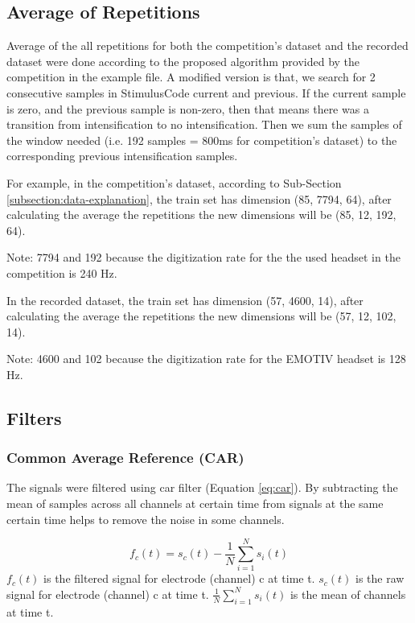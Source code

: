 \subsection{Average of Repetitions}
Average of the all repetitions for both the competition's dataset and the recorded dataset were done according to the proposed algorithm provided by the competition in the example file. A modified version is that, we search for 2 consecutive samples in StimulusCode current and previous. If the current sample is zero, and the previous sample is non-zero, then that means there was a transition from intensification to no intensification. Then we sum the samples of the window needed (i.e. 192 samples = 800ms for competition's dataset) to the corresponding previous intensification samples.\par
For example, in the competition's dataset, according to Sub-Section \ref{subsection:data-explanation}, the train set has dimension (85, 7794, 64), after calculating the average the repetitions the new dimensions will be (85, 12, 192, 64).\par
Note: 7794 and 192 because the digitization rate for the the used headset in the competition is 240 Hz.\par
In the recorded dataset, the train set has dimension (57, 4600, 14), after calculating the average the repetitions the new dimensions will be (57, 12, 102, 14).\par
Note: 4600 and 102 because the digitization rate for the EMOTIV headset is 128 Hz.\par
\subsection{Filters}
\subsubsection{Common Average Reference (CAR)}
The signals were filtered using \ac{car} filter (Equation \ref{eq:car}). By subtracting the mean of samples across all channels at certain time from signals at the same certain time helps to remove the noise in some channels.\par
\begin{equation}
    f_c(t) = s_c(t) - \frac{1}{N} \sum_{i=1}^N s_i(t)
    \label{eq:car}
\end{equation}
$f_c(t)$ is the filtered signal for electrode (channel) c at time t. $s_c(t)$ is the raw signal for electrode (channel) c at time t. $\frac{1}{N} \sum_{i=1}^{N} s_i(t)$ is the mean of channels at time t.\par
